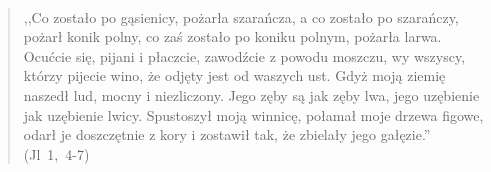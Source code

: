 \documentclass[10pt,a4paper,oneside]{article}
\begin{document}
\paragraph{}
\begin{quote}
,,Co zostało po gąsienicy, pożarła szarańcza, a co zostało po szarańczy, pożarł konik polny, co zaś zostało po koniku polnym, pożarła larwa. Ocućcie się, pijani i płaczcie, zawodźcie z powodu moszczu, wy wszyscy, którzy pijecie wino, że odjęty jest od waszych ust. Gdyż moją ziemię naszedł lud, mocny i niezliczony. Jego zęby są jak zęby lwa, jego uzębienie jak uzębienie lwicy. Spustoszył moją winnicę, połamał moje drzewa figowe, odarł je doszczętnie z kory i zostawił tak, że zbielały jego gałęzie.'' \mbox{(Jl 1, 4-7)}
\end{quote}
\end{document}
